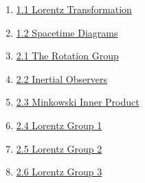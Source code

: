 \documentclass[11pt]{article}
\begin{document}
\begin{multicols}{2}
	\begin{enumerate}
		\item \href{https://mp.weixin.qq.com/s/SMAEkNDP9b9GHUVlots4jQ}{1.1 Lorentz Transformation}	%
		\item \href{https://mp.weixin.qq.com/s/N4GhvLC6NFocHXlVMkYEyg}{1.2 Spacetime Diagrams}	%
		\item \href{https://mp.weixin.qq.com/s/7ATcKCxDSC692_iJmPP3MQ}{2.1 The Rotation Group}	%
		\item \href{https://mp.weixin.qq.com/s/jpMAKknE5c0OcAJezwamXw}{2.2 Inertial Observers}	%
		\item \href{https://mp.weixin.qq.com/s/ztXrjtrttet0XPG5uaooCQ}{2.3 Minkowski Inner Product}	%
		\item \href{https://mp.weixin.qq.com/s/3jdA3fXOkUjn6OUtIC-eXQ}{2.4 Lorentz Group 1}	%
		\item \href{https://mp.weixin.qq.com/s/29yaWMUV4WL-ATD2LuKV4g}{2.5 Lorentz Group 2}	%
		\item \href{https://mp.weixin.qq.com/s/E65L2zPNOL2l2-Wdjfg-aA}{2.6 Lorentz Group 3}	%
	\end{enumerate}
	
\end{multicols}
\end{document}
